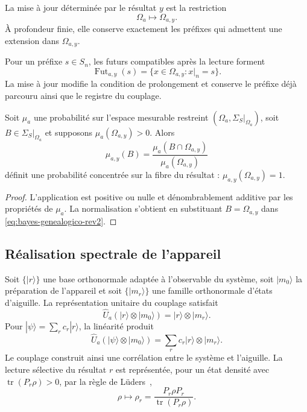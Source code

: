 \begin{definition}
La mise à jour déterminée par le résultat \(y\) est la restriction
\[
 \Omega_a\longmapsto\Omega_{a,y}.
\]
À profondeur finie, elle conserve exactement les préfixes qui admettent une extension dans \(\Omega_{a,y}\).
\end{definition}

Pour un préfixe \(s\in S_n\), les futurs compatibles après la lecture forment
\[
 \operatorname{Fut}_{a,y}(s)
 =\{x\in\Omega_{a,y}:x|_n=s\}.
\]
La mise à jour modifie la condition de prolongement et conserve le préfixe déjà parcouru ainsi que le registre du couplage.

\begin{proposition}
\label{prop:probabilidad-condicionada-medida-rev2}
Soit \(\mu_a\) une probabilité sur l’espace mesurable restreint \((\Omega_a,\Sigma_S|_{\Omega_a})\), soit \(B\in\Sigma_S|_{\Omega_a}\) et supposons \(\mu_a(\Omega_{a,y})>0\). Alors
\begin{equation}
 \mu_{a,y}(B)
 =\frac{\mu_a(B\cap\Omega_{a,y})}
        {\mu_a(\Omega_{a,y})}
 \label{eq:bayes-genealogico-rev2}
\end{equation}
définit une probabilité concentrée sur la fibre du résultat : \(\mu_{a,y}(\Omega_{a,y})=1\).
\end{proposition}

\begin{proof}
L’application est positive ou nulle et dénombrablement additive par les propriétés de \(\mu_a\). La normalisation s’obtient en substituant \(B=\Omega_{a,y}\) dans \eqref{eq:bayes-genealogico-rev2}.
\end{proof}

\subsection{Réalisation spectrale de l’appareil}

Soit \(\{|r\rangle\}\) une base orthonormale adaptée à l’observable du système, soit \(|m_0\rangle\) la préparation de l’appareil et soit \(\{|m_r\rangle\}\) une famille orthonormale d’états d’aiguille. La représentation unitaire du couplage satisfait
\begin{equation}
 \widehat U_a(|r\rangle\otimes|m_0\rangle)
 =|r\rangle\otimes|m_r\rangle.
 \label{eq:premedicion-espectral-rev2}
\end{equation}
Pour \(|\psi\rangle=\sum_r c_r|r\rangle\), la linéarité produit
\[
 \widehat U_a(|\psi\rangle\otimes|m_0\rangle)
 =\sum_r c_r|r\rangle\otimes|m_r\rangle.
\]
Le couplage construit ainsi une corrélation entre le système et l’aiguille. La lecture sélective du résultat \(r\) est représentée, pour un état densité avec \(\operatorname{tr}(P_r\rho)>0\), par la règle de Lüders~\cite{Lueders1950},
\begin{equation}
 \rho\longmapsto
 \rho_r=\frac{P_r\rho P_r}{\operatorname{tr}(P_r\rho)}.
 \label{eq:luders-genealogico-rev2}
\end{equation}

